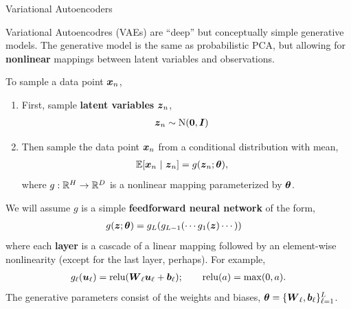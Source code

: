 \documentclass[aspectratio=169]{beamer}
\begin{document}
\begin{frame}[t,allowframebreaks]{Variational Autoencoders}\label{variational-autoencoders}

Variational Autoencodres (VAEs) are ``deep'' but conceptually simple
generative models. The generative model is the same as probabilistic PCA, but allowing for \textbf{nonlinear} mappings between latent variables and
observations.

To sample a data point \(\boldsymbol{x}_n\), 
\begin{enumerate}
    \item First, sample \textbf{latent variables} \(\boldsymbol{z}_n\), 
    \begin{align*}
    \boldsymbol{z}_n &\sim \mathrm{N}(\boldsymbol{0}, \boldsymbol{I}) 
    \end{align*}

    \item Then sample the data point \(\boldsymbol{x}_n\) from a conditional distribution with mean, 
    \begin{align*}
    \mathbb{E}[\boldsymbol{x}_n ~\vert~ \boldsymbol{z}_n] &= g(\boldsymbol{z}_n; \boldsymbol{\theta}),
    \end{align*} 
    where \(g: \mathbb{R}^H \to \mathbb{R}^D\) is a nonlinear mapping parameterized by \(\boldsymbol{\theta}\).
\end{enumerate}

We will assume \(g\) is a simple \textbf{feedforward neural network} of
the form, 
\begin{align*}
    g(\boldsymbol{z}; \boldsymbol{\theta}) &= g_L(g_{L-1}(\cdots g_1(\boldsymbol{z}) \cdots))
\end{align*} 
where each \textbf{layer} is a cascade of a linear mapping
followed by an element-wise nonlinearity (except for the last layer,
perhaps). For example, 
\begin{align*}
    g_\ell(\boldsymbol{u}_{\ell}) = \mathrm{relu}(\boldsymbol{W}_\ell \boldsymbol{u}_{\ell} + \boldsymbol{b}_\ell); \qquad \mathrm{relu}(a) = \max(0, a).
\end{align*} 
The generative parameters consist of the weights and
biases, \(\boldsymbol{\theta} = \{\boldsymbol{W}_\ell, \boldsymbol{b}_\ell\}_{\ell=1}^L\).
\end{frame}
\end{document}

